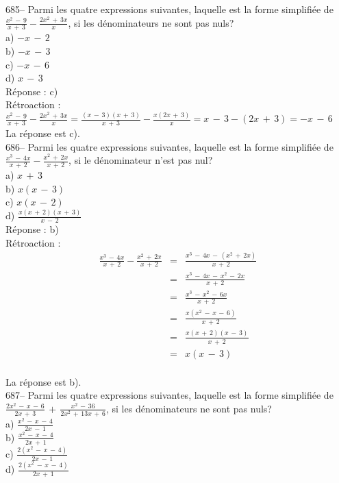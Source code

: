 ﻿\documentclass[letterpaper, 12pt]{article}
\begin{document}
685-- Parmi les quatre expressions suivantes, laquelle est la forme
simplifi\'ee de $\frac{x^{2}\,-\,9}{x\,+\,3}-\frac{2x^{2}\,+\,3x}{x}$, si
les d\'enominateurs ne sont pas nuls?\\
a) $-x\,-\,2$\\
b) $-x\,-\,3$\\
c) $-x\,-\,6$\\
d) $x\,-\,3$\\

R\'eponse : c)\\

R\'etroaction : \\[2mm]
$\frac{x^{2}\,-\,9}{x\,+\,3}-\frac{2x^{2}\,+\,3x}{x}=\frac{\left(
x\,-\,3\right) \left( x\,+\,3\right) }{x\,+\,3} -\frac{x\left(
2x\,+\,3\right) }{x}=x\,-\,3-\left( 2x\,+\,3\right) =-x\,-\,6$\\[2mm]
La r\'eponse est c).\\

686-- Parmi les quatre expressions suivantes, laquelle est la forme
simplifi\'ee de $\frac{x^{3}\,-\,4x}{x\,+\,2}-\frac{x^{2}\,+\,2x}{x\,+\,2}$,
si le d\'enominateur n'est pas nul?\\
a) $ x\,+\,3$\\[2mm]
b) $x\left( x\,-\,3\right) $\\[2mm]
c) $x\left( x\,-\,2\right) $\\[2mm]
d) $\frac{x\left( x\,+\,2\right) \left( x\,+\,3\right)}{x\,-\,2}$\\

R\'eponse : b)\\

R\'etroaction : \\
\begin{eqnarray*}
\frac{x^{3}\,-\,4x}{x\,+\,2}-\frac{x^{2}\,+\,2x}{x\,+\,2}&=&\frac{x^{3}\,-\,4x\,-\,(x^{2}\,+\,2x)}{x\,+\,2}\\[2mm]
&=&\frac{x^{3}\,-\,4x\,-\,x^{2}\,-\,2x}{x\,+\,2}\\[2mm]
&=&\frac{x^{3}\,-\,x^{2}\,-\,6x}{x\,+\,2}\\[2mm]
&=&\frac{x(x^{2}\,-\,x\,-\,6)}{x\,+\,2}\\[2mm]
&=&\frac{x(x\,+\,2)(x\,-\,3)}{x\,+\,2}\\[2mm]
&=&x(x\,-\,3)\\
\end{eqnarray*}

La r\'eponse est b).\\

687-- Parmi les quatre expressions suivantes, laquelle est la forme
simplifi\'ee de
$\frac{2x^{2}\,-\,x\,-\,6}{2x\,+\,3}\,+\,\frac{x^{2}\,-\,36}{2x^{2}\,+\,13x\,+\,6}$,
si les d\'enominateurs ne sont pas nuls?\\
a) $\frac{x^{2}\,-\,x\,-\,4}{2x\,-\,1}$\\[2mm]
b) $\frac{x^{2}\,-\,x\,-\,4}{2x\,+\,1}$\\[2mm]
c) $\frac{2(x^{2}\,-\,x\,-\,4)}{2x\,-\,1}$\\[2mm]
d) $\frac{2(x^{2}\,-\,x\,-\,4)}{2x\,+\,1}$\\[2mm]
\end{document}
